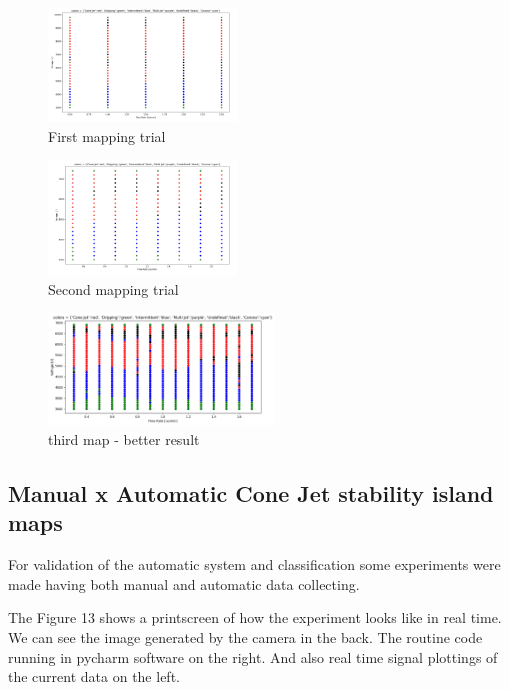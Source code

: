 \begin{multicols}{3}


    \begin{figure}[H]
        \center
        \includegraphics[width=5cm]{Figuras/report3/map1.png}
        \caption{First mapping trial}
    \end{figure}

    \begin{figure}[H]
        \center
        \includegraphics[width=5cm]{Figuras/report3/map2.png}
        \caption{Second mapping trial}
    \end{figure}


    \begin{figure}[H]
        \center
        \includegraphics[width=6cm]{Figuras/report3/map3.png}
        \caption{third map - better result}
    \end{figure}

\end{multicols}



\subsection{Manual x Automatic Cone Jet stability island maps}

For validation of the automatic system and classification some experiments were made having both manual and automatic data collecting.

The Figure 13 shows a printscreen of how the experiment looks like in real time.
We can see the image generated by the camera in the back.
The routine code running in pycharm software on the right.
And also real time signal plottings of the current data on the left.

